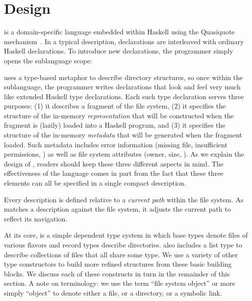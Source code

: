 \section{\forest{} Design}
\label{sec:language}

\forest{} is a domain-specific language embedded within Haskell using
the Quasiquote mechanism~\cite{Mainland:quasi}.  In a typical
\forest{} description, \forest{} declarations are interleaved with ordinary
Haskell declarations.  To introduce new \forest{} declarations,
the programmer simply opens the \forest{} sublanguage scope:
\begin{code}
\end{code}

\forest{} uses a type-based metaphor to describe directory
structures, so once  within the \forest{} sublanguage, the programmer
writes declarations that look and feel very much like extended Haskell
type declarations. 
Each such type declaration serves three purposes: 
(1) it describes a fragment of the file system,
(2) it specifies the structure of the in-memory {\em representation}
    that will be constructed when the fragment is (lazily) loaded into a Haskell program, and 
(3) it specifies the structure of the in-memory {\em metadata}
    that will be generated when the fragment loaded.
Such metadata includes error information (missing file, insufficient
permissions, \etc{})  as well as file system attributes (owner, size, \etc{}).
As we explain the design of \forest{}, 
readers should keep these three different aspects in mind.  
The effectiveness of the \forest{} language comes in part from the fact that these three 
elements can all be specified in a single compact description.  

Every \forest{} description is defined relative to a
{\em current path} within the file system.  As 
\forest{} matches a description against the file system, it 
adjusts the current path to reflect its navigation.

At its core, \forest{} is a simple dependent type system in which base
types denote files of various flavors and record types describe
directories.  \forest{} also includes a list type to describe
collections of files that all share some type.  We use a variety of
other type constructors to build more refined structures from these
basic building blocks.  We discuss each of these constructs in turn in
the remainder of this section.  A note on terminology: we use the term
``file system object'' or more simply ``object'' to denote either a
file, or a directory, or a symbolic link. 


